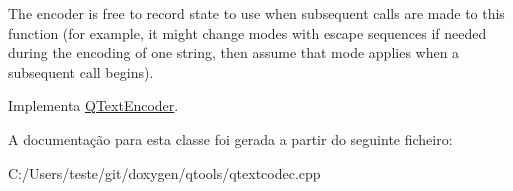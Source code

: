 The encoder is free to record state to use when subsequent calls are made to this function (for example, it might change modes with escape sequences if needed during the encoding of one string, then assume that mode applies when a subsequent call begins). 

Implementa \hyperlink{class_q_text_encoder_aacab43367cc5203dd9ec329729914442}{Q\-Text\-Encoder}.



A documentação para esta classe foi gerada a partir do seguinte ficheiro\-:\begin{DoxyCompactItemize}
\item 
C\-:/\-Users/teste/git/doxygen/qtools/qtextcodec.\-cpp\end{DoxyCompactItemize}

